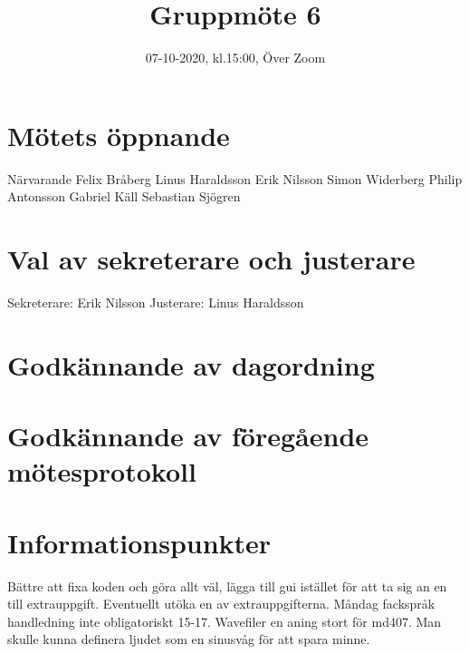 \documentclass{article}
\title{Gruppmöte 6}
\date{07-10-2020, kl.15:00, Över Zoom}
\begin{document}
 \maketitle

\section{Mötets öppnande} 
Närvarande
Felix Bråberg
Linus Haraldsson
Erik Nilsson
Simon Widerberg
Philip Antonsson
Gabriel Käll
Sebastian Sjögren

\section{Val av sekreterare och justerare} 
Sekreterare: Erik Nilsson
\newline
Justerare: Linus Haraldsson

\section{Godkännande av dagordning}

\section{Godkännande av föregående mötesprotokoll} 

\section{Informationspunkter} 
Bättre att fixa koden och göra allt väl, lägga till gui istället för att ta sig an en till extrauppgift. Eventuellt utöka en av extrauppgifterna.
\newline
\newline
Måndag fackspråk handledning inte obligatoriskt 15-17.
\newline
\newline
Wavefiler en aning stort för md407. Man skulle kunna definera ljudet som en sinusvåg för att spara minne.

\begin{itemize} \end{itemize} 
\end{document}
